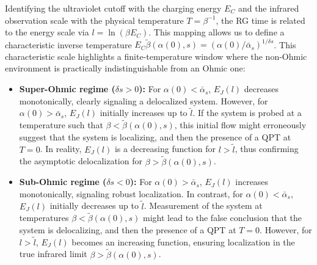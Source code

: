 \documentclass[aps,notitlepage,twocolumn,prl,nolongbibliography,superscriptaddress]{revtex4-2}
\begin{document}
Identifying the ultraviolet cutoff with the charging energy $E_C$ and the infrared observation scale with the physical temperature $T = \beta^{-1}$, the RG time is related to the energy scale via $l = \ln(\beta E_C)$. This mapping allows us to define a characteristic inverse temperature $E_C \tilde{\beta}(\alpha(0), s) = (\alpha(0)/\bar{\alpha}_s)^{1/\delta s}$. This characteristic scale highlights a finite-temperature window where the non-Ohmic environment is practically indistinguishable from an Ohmic one:
\begin{itemize}
    \item \textbf{Super-Ohmic regime ($\delta s > 0$):} For $\alpha(0) < \bar{\alpha}_s$, $E_J(l)$ decreases monotonically, clearly signaling a delocalized system. However, for $\alpha(0) > \bar{\alpha}_s$, $E_J(l)$ initially increases up to $\tilde{l}$. If the system is probed at a temperature such that $\beta < \tilde{\beta}(\alpha(0), s)$, this initial flow might erroneously suggest that the system is localizing, and then the presence of a QPT at $T=0$. In reality, $E_J(l)$ is a decreasing function for $l > \tilde{l}$, thus confirming the asymptotic delocalization for $\beta > \tilde{\beta}(\alpha(0), s)$.
    \item \textbf{Sub-Ohmic regime ($\delta s < 0$):} For $\alpha(0) > \bar{\alpha}_s$, $E_J(l)$ increases monotonically, signaling robust localization. In contrast, for $\alpha(0) < \bar{\alpha}_s$, $E_J(l)$ initially decreases up to $\tilde{l}$. Measurement of the system at temperatures $\beta < \tilde{\beta}(\alpha(0), s)$ might lead to the false conclusion that the system is delocalizing, and then the presence of a QPT at $T=0$. However, for $l > \tilde{l}$, $E_J(l)$ becomes an increasing function, ensuring localization in the true infrared limit $\beta > \tilde{\beta}(\alpha(0), s)$.
\end{itemize}
\end{document}
